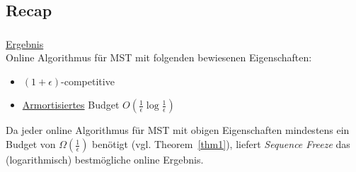 \subsection{Recap}
\begin{frame}
    \frametitle{\insertsection}
    \underline{Ergebnis}\\
    \vspace{1em}
    Online Algorithmus für MST mit folgenden bewiesenen Eigenschaften:\\
    \vspace{1em}
    \begin{itemize}
        \itemsep\setlength{.8em}
        \item $(1+\epsilon)$-competitive
        \item \underline{Armortisiertes} Budget $O(\frac{1}{\epsilon}\log\frac{1}{\epsilon})$
    \end{itemize}
    \vspace{1em}
    Da jeder online Algorithmus für MST mit obigen Eigenschaften mindestens ein Budget von $\Omega(\frac{1}{\epsilon})$ benötigt (vgl. Theorem~\ref{thm1}), liefert \emph{Sequence Freeze} das (logarithmisch) bestmögliche online Ergebnis.
\end{frame}